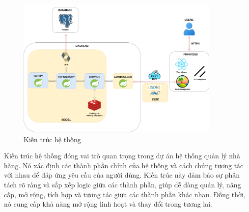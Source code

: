 
\begin{figure}[H]
    \centering
    \includegraphics[width=10cm]{Images/kien-truc-he-thong.drawio.png}
    \vspace{0.5cm}
    \caption{Kiến trúc hệ thống}
    \label{fig:my_label}
\end{figure}

Kiến trúc hệ thống đóng vai trò quan trọng trong dự án hệ thống quản lý nhà hàng. Nó xác định các thành phần chính của hệ thống và cách chúng tương tác với nhau để đáp ứng yêu cầu của người dùng. Kiến trúc này đảm bảo sự phân tách rõ ràng và sắp xếp logic giữa các thành phần, giúp dễ dàng quản lý, nâng cấp, mở rộng, tích hợp và tương tác giữa các thành phần khác nhau. Đồng thời, nó cung cấp khả năng mở rộng linh hoạt và thay đổi trong tương lai.

